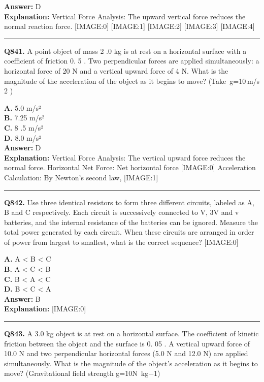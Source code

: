 \documentclass[12pt]{article}
\begin{document}
\textbf{Answer:} D \\
\textbf{Explanation:} Vertical Force Analysis:
The upward vertical force reduces the normal reaction force.
[IMAGE:0]
[IMAGE:1]
[IMAGE:2]
[IMAGE:3]
[IMAGE:4]

\hrule
\vspace{1em}


\noindent
\textbf{Q841.} A point object of mass 2
.0 kg is at rest on a horizontal surface with a coefficient of friction 0.
5
. Two perpendicular forces are applied simultaneously: a horizontal force of 20 N and a vertical upward force of 4 N. What is the magnitude of the acceleration of the object as it begins to move? (Take g=10 m/s
2
)



\textbf{A.} 5.0 m/s² \\
\textbf{B.} 7.25 m/s² \\
\textbf{C.} 8
.5 m/s² \\
\textbf{D.} 8.0 m/s² \\

\textbf{Answer:} D \\
\textbf{Explanation:} Vertical Force Analysis: The vertical upward force reduces the normal force.
Horizontal Net Force: Net horizontal force
[IMAGE:0]
Acceleration Calculation: By Newton’s second law,
[IMAGE:1]

\hrule
\vspace{1em}


\noindent
\textbf{Q842.} Use three identical resistors to form three different circuits, labeled as A, B and C respectively. Each circuit is successively connected to V, 3V and v batteries, and the internal resistance of the batteries can be ignored. Measure the total power generated by each circuit. When these circuits are arranged in order of power from largest to smallest, what is the correct sequence?
[IMAGE:0]



\textbf{A.} A < B < C \\
\textbf{B.} A < C < B \\
\textbf{C.} B < A < C \\
\textbf{D.} B < C < A \\

\textbf{Answer:} B \\
\textbf{Explanation:} [IMAGE:0]

\hrule
\vspace{1em}


\noindent
\textbf{Q843.} A 3.0 kg object is at rest on a horizontal surface. The coefficient of kinetic friction between the object and the surface is 0.
05
. A vertical upward force of 10.0 N and two perpendicular horizontal forces (5.0 N and 12.0 N) are applied simultaneously. What is the magnitude of the object's acceleration as it begins to move? (Gravitational field strength g=10N kg−1)
\end{document}
